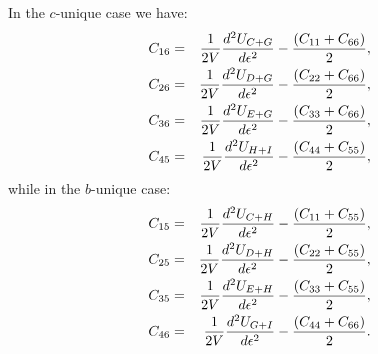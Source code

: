 \documentclass[12pt,a4paper]{article}
\begin{document}
In the $c$-unique case we have:
\begin{eqnarray}
C_{16}&=&{1 \over 2 V} {d^2 U_{C+G} \over d \epsilon^2} - {(C_{11} + C_{66})\over 2}, \\
C_{26}&=&{1 \over 2 V} {d^2 U_{D+G} \over d \epsilon^2} - {(C_{22} + C_{66})\over 2}, \\
C_{36}&=&{1 \over 2 V} {d^2 U_{E+G} \over d \epsilon^2} - {(C_{33} + C_{66})\over 2}, \\
C_{45}&=&{1 \over 2 V} {d^2 U_{H+I} \over d \epsilon^2} - {(C_{44} + C_{55})\over 2},
\end{eqnarray}
while in the $b$-unique case:
\begin{eqnarray}
C_{15}&=&{1 \over 2 V} {d^2 U_{C+H} \over d \epsilon^2} - {(C_{11} + C_{55})\over 2}, \\
C_{25}&=&{1 \over 2 V} {d^2 U_{D+H} \over d \epsilon^2} - {(C_{22} + C_{55})\over 2}, \\
C_{35}&=&{1 \over 2 V} {d^2 U_{E+H} \over d \epsilon^2} - {(C_{33} + C_{55})\over 2}, \\
C_{46}&=&{1 \over 2 V} {d^2 U_{G+I} \over d \epsilon^2} - {(C_{44} + C_{66})\over 2}. 
\end{eqnarray}
\end{document}
